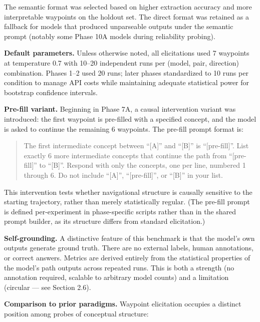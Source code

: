 The semantic format was selected based on higher extraction accuracy and more interpretable waypoints on the holdout set. The direct format was retained as a fallback for models that produced unparseable outputs under the semantic prompt (notably some Phase 10A models during reliability probing).

\textbf{Default parameters.} Unless otherwise noted, all elicitations used 7 waypoints at temperature 0.7 with 10--20 independent runs per (model, pair, direction) combination. Phases 1--2 used 20 runs; later phases standardized to 10 runs per condition to manage API costs while maintaining adequate statistical power for bootstrap confidence intervals.

\textbf{Pre-fill variant.} Beginning in Phase 7A, a causal intervention variant was introduced: the first waypoint is pre-filled with a specified concept, and the model is asked to continue the remaining 6 waypoints. The pre-fill prompt format is:

\begin{quote}
The first intermediate concept between ``{[}A{]}'' and ``{[}B{]}'' is ``{[}pre-fill{]}''. List exactly 6 more intermediate concepts that continue the path from ``{[}pre-fill{]}'' to ``{[}B{]}''. Respond with only the concepts, one per line, numbered 1 through 6. Do not include ``{[}A{]}'', ``{[}pre-fill{]}'', or ``{[}B{]}'' in your list.
\end{quote}

This intervention tests whether navigational structure is causally sensitive to the starting trajectory, rather than merely statistically regular. (The pre-fill prompt is defined per-experiment in phase-specific scripts rather than in the shared prompt builder, as its structure differs from standard elicitation.)

\textbf{Self-grounding.} A distinctive feature of this benchmark is that the model's own outputs generate ground truth. There are no external labels, human annotations, or correct answers. Metrics are derived entirely from the statistical properties of the model's path outputs across repeated runs. This is both a strength (no annotation required, scalable to arbitrary model counts) and a limitation (circular --- see Section 2.6).

\textbf{Comparison to prior paradigms.} Waypoint elicitation occupies a distinct position among probes of conceptual structure:


